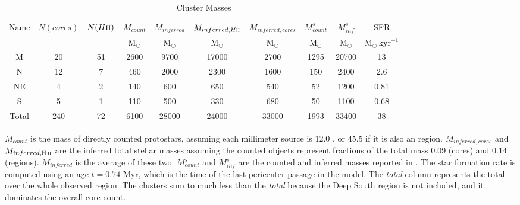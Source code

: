 \begin{table*}[htp]
\centering
\caption{Cluster Masses}
\begin{tabular}{cccccccccc}
\label{tab:clustermassestimates}
Name & $N(cores)$ & $N(H\textsc{ii})$ & $M_{count}$ & $M_{inferred}$ & $M_{inferred, H\textsc{ii}}$ & $M_{inferred, cores}$ & $M_{count}^s$ & $M_{inf}^s$ & SFR \\
 &  &  & $\mathrm{M_{\odot}}$ & $\mathrm{M_{\odot}}$ & $\mathrm{M_{\odot}}$ & $\mathrm{M_{\odot}}$ & $\mathrm{M_{\odot}}$ & $\mathrm{M_{\odot}}$ & $\mathrm{M_{\odot}\,kyr^{-1}}$ \\
\hline
M & 20 & 51 & 2600 & 9700 & 17000 & 2700 & 1295 & 20700 & 13 \\
N & 12 & 7 & 460 & 2000 & 2300 & 1600 & 150 & 2400 & 2.6 \\
NE & 4 & 2 & 140 & 600 & 650 & 540 & 52 & 1200 & 0.81 \\
S & 5 & 1 & 110 & 500 & 330 & 680 & 50 & 1100 & 0.68 \\
Total & 240 & 72 & 6100 & 28000 & 24000 & 33000 & 1993 & 33400 & 38 \\
\hline
\end{tabular}
\par
$M_{count}$ is the mass of directly counted protostars, assuming each millimeter source is 12.0 \msun, or 45.5 \msun if it is also an \hii region.  $M_{inferred,cores}$ and $M_{inferred,\hii}$ are the inferred total stellar masses assuming the counted objects represent fractions of the total mass 0.09 (cores) and 0.14 (\hii regions).  $M_{inferred}$ is the average of these two.  $M_{count}^s$ and $M_{inf}^s$ are the counted and inferred masses reported in \citet{Schmiedeke2016a}.  The star formation rate is computed using an age $t=0.74$ Myr, which is the time of the last pericenter passage in the \citet{Kruijssen2015a} model.  The \emph{total} column represents the total over the whole observed region.    The clusters sum to much less than the \emph{total} because the Deep South region is not included, and it dominates the overall core count.
\end{table*}
